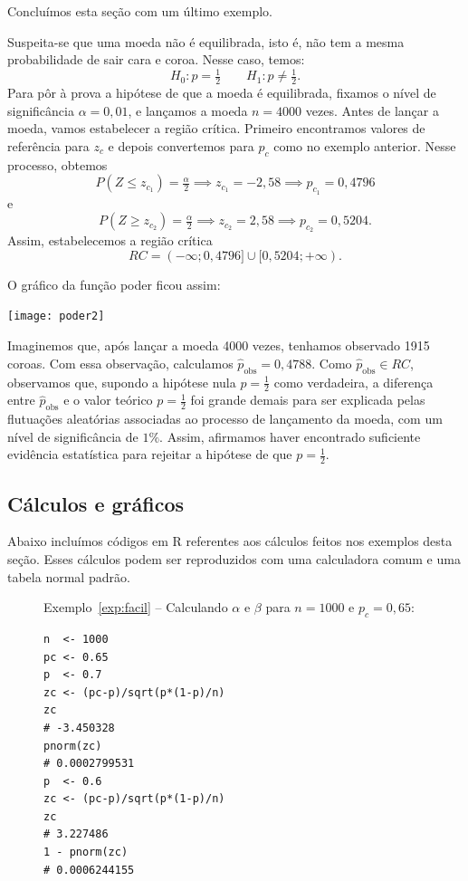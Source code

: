 \documentclass[12pt,a4paper]{article}
\theoremstyle{plain}
\theoremstyle{definition}
\theoremstyle{remark}
\newenvironment{example}{\pushQED{\qed}\renewcommand{\qedsymbol}{\scriptsize$\triangle$}\examplex}{\popQED\endexamplex}
\begin{document}
Concluímos esta seção com um último exemplo.

\begin{example}
\label{exp:moeda}
Suspeita-se que uma moeda não é equilibrada, isto é, não tem a mesma probabilidade de sair cara e coroa.
Nesse caso, temos:
\[
H_0:p=\tfrac{1}{2}
\qquad
H_1:p\ne\tfrac{1}{2}
.
\]
Para pôr à prova a hipótese de que a moeda é equilibrada, fixamos o nível de significância $\alpha=0,01$, e lançamos a moeda $n=4000$ vezes.
Antes de lançar a moeda, vamos estabelecer a região crítica.
Primeiro encontramos valores de referência para $z_c$ e depois convertemos para $p_c$ como no exemplo anterior.
Nesse processo, obtemos
\[
P(Z \leq z_{c_1})=\tfrac{\alpha}{2}
\implies
z_{c_1} = -2,58
\implies
p_{c_1} = 0,4796
\]
e
\[
P(Z \geq z_{c_2})=\tfrac{\alpha}{2}
\implies
z_{c_2} = 2,58
\implies
p_{c_2} = 0,5204
.
\]
Assim, estabelecemos a região crítica
\[
RC=
(-\infty; 0,4796] \cup [0,5204; +\infty)
.
\]

O gráfico da função poder ficou assim:

\hfil \texttt{[image: poder2]}

Imaginemos que, após lançar a moeda 4000 vezes, tenhamos observado 1915 coroas.
Com essa observação, calculamos $\hat{p}_{\mathrm{obs}}=0,4788$.
Como $\hat{p}_{\mathrm{obs}} \in RC$, observamos que, supondo a hipótese nula $p=\frac{1}{2}$ como verdadeira, a diferença entre $\hat{p}_{\mathrm{obs}}$ e o valor teórico $p=\frac{1}{2}$ foi grande demais para ser explicada pelas flutuações aleatórias associadas ao processo de lançamento da moeda, com um nível de significância de $1\%$.
Assim, afirmamos haver encontrado suficiente evidência estatística para rejeitar a hipótese de que $p=\frac{1}{2}$.
\end{example}

\subsection*{Cálculos e gráficos}

Abaixo incluímos códigos em R referentes aos cálculos feitos nos exemplos desta seção.
Esses cálculos podem ser reproduzidos com uma calculadora comum e uma tabela normal padrão.
	
\begin{figure}[H]
Exemplo~\ref{exp:facil}
--
Calculando $\alpha$ e $\beta$ para $n=1000$ e $p_c=0,65$:
\footnotesize
\begin{verbatim}
n  <- 1000
pc <- 0.65
p  <- 0.7
zc <- (pc-p)/sqrt(p*(1-p)/n)
zc
# -3.450328
pnorm(zc)
# 0.0002799531
p  <- 0.6
zc <- (pc-p)/sqrt(p*(1-p)/n)
zc
# 3.227486
1 - pnorm(zc)
# 0.0006244155
\end{verbatim}
\end{figure}
\end{document}
